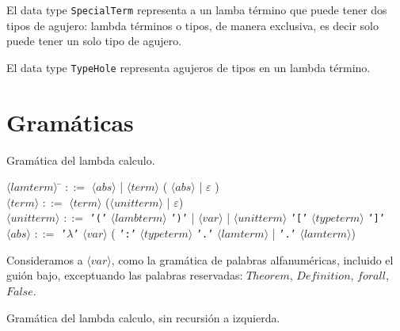 \documentclass[a4paper,11pt]{article}
\begin{document}
El data type \texttt{SpecialTerm} representa a un lamba término que puede tener dos tipos de agujero: lambda términos o tipos, de manera
exclusiva, es decir solo puede tener un solo tipo de agujero.

El data type \texttt{TypeHole} representa agujeros de tipos en un lambda término.

\section{Gramáticas}
 Gramática del lambda calculo.

\begin{tabbing}
$\langle lamterm \rangle$ \= $::=$ $\langle abs \rangle$ | $\langle term \rangle$ ( $\langle abs \rangle$ | $\varepsilon$ ) \\

$\langle term \rangle$ \> $::=$ $\langle term \rangle$ ($\langle unitterm \rangle$ | $\varepsilon$) \\

$\langle unitterm \rangle$ \> $::=$ \texttt{'('} $\langle lambterm \rangle$ \texttt{')'} |
$\langle var \rangle$ | $\langle unitterm \rangle$ \texttt{'['} $\langle typeterm \rangle$ \texttt{']'}\\

$\langle abs \rangle$ \> $::=$ \texttt{'$\lambda$'} $\langle var \rangle$ ( \texttt{':'} $\langle typeterm \rangle$ \texttt{'.'} $\langle lamterm \rangle$
| \texttt{'.'} $\langle lamterm \rangle$)
\end{tabbing}

Consideramos a $\langle var \rangle$, como la gramática de palabras alfanuméricas, incluido el guión bajo, exceptuando
las palabras reservadas: $Theorem$, $Definition$, $forall$, $False$.

Gramática del lambda calculo, sin recursión a izquierda.
\end{document}
